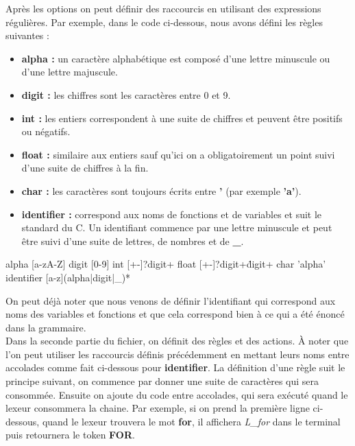 \documentclass[a4paper]{article}%
\begin{document}
Après les options on peut définir des raccourcis en utilisant des expressions
régulières. Par exemple, dans le code ci-dessous, nous avons défini les règles
suivantes :

\begin{itemize}
  \item \textbf{alpha :} un caractère alphabétique est composé d'une lettre
    minuscule ou d'une lettre majuscule.
  \item \textbf{digit :} les chiffres sont les caractères entre 0 et 9.
  \item \textbf{int :} les entiers correspondent à une suite de chiffres et
    peuvent être positifs ou négatifs.
  \item \textbf{float :} similaire aux entiers sauf qu'ici on a obligatoirement
    un point suivi d'une suite de chiffres à la fin.
  \item \textbf{char :} les caractères sont toujours écrits entre \textbf{'}
    (par exemple \textbf{'a'}).
  \item \textbf{identifier :} correspond aux noms de fonctions et de variables
    et suit le standard du C. Un identifiant commence par une lettre minuscule
    et peut être suivi d'une suite de lettres, de nombres et de \textbf{\_}.
\end{itemize}

\begin{code}
alpha [a-zA-Z]
digit [0-9]
int [+-]?{digit}+
float [+-]?{digit}+\.{digit}+
char '{alpha}'
identifier [a-z]({alpha}|{digit}|_)*
\end{code}\leavevmode\newline

\noindent

On peut déjà noter que nous venons de définir l'identifiant qui correspond aux
noms des variables et fonctions et que cela correspond bien à ce qui a été
énoncé dans la grammaire.\\

Dans la seconde partie du fichier, on définit des règles et des actions. À noter
que l'on peut utiliser les raccourcis définis précédemment en mettant leurs noms
entre accolades comme fait ci-dessous pour \textbf{identifier}. La définition
d'une règle suit le principe suivant, on commence par donner une suite de
caractères qui sera consommée. Ensuite on ajoute du code entre accolades, qui
sera exécuté quand le lexeur consommera la chaine. Par exemple, si on prend la
première ligne ci-dessous, quand le lexeur trouvera le mot \textbf{for}, il
affichera \textit{L\_for} dans le terminal puis retournera le token \textbf{FOR}.
\end{document}
